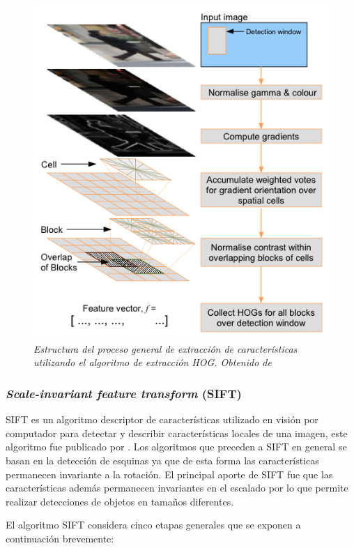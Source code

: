 \begin{figure}[tp]
  \centering
  \includegraphics[scale=.6]{images/hogprocess}
  \caption{\em Estructura del proceso general de extracción de características utilizando el algoritmo de extracción HOG. Obtenido de \cite{dalal2006}}  
  \label{fig:hogscheme}
\end{figure}

\subsubsection{\textit{Scale-invariant feature transform} (SIFT)}

SIFT es un algoritmo descriptor de características utilizado en visión por computador para detectar y describir características locales de una imagen, este algoritmo fue publicado por \cite{lowe1999object}. Los algoritmos que preceden a SIFT en general se basan en la detección de esquinas ya que de esta forma las características permanecen invariante a la rotación. El principal aporte de SIFT fue que las características además permanecen invariantes en el escalado por lo que permite realizar detecciones de objetos en tamaños diferentes.

El algoritmo SIFT considera cinco etapas generales que se exponen a continuación brevemente:

